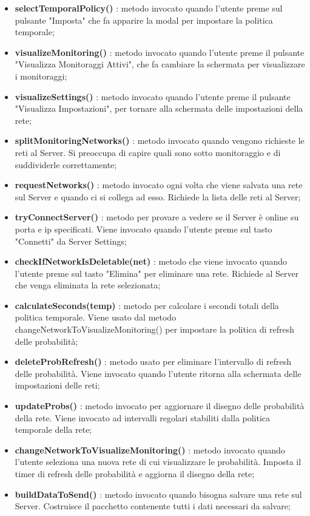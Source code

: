 \begin{itemize}
\begin{itemize}
			\item \textbf{selectTemporalPolicy()} : metodo invocato quando l'utente preme sul pulsante "Imposta" che fa apparire la modal per impostare la politica temporale;
			\item \textbf{visualizeMonitoring()} : metodo invocato quando l'utente preme il pulsante "Visualizza Monitoraggi Attivi", che fa cambiare la schermata per visualizzare i monitoraggi;
			\item \textbf{visualizeSettings()} : metodo invocato quando l'utente preme il pulsante "Visualizza Impostazioni", per tornare alla schermata delle impostazioni della rete;
			\item \textbf{splitMonitoringNetworks()} : metodo invocato quando vengono richieste le reti al Server. Si preoccupa di capire quali sono sotto monitoraggio e di suddividerle correttamente;
			\item \textbf{requestNetworks()} : metodo invocato ogni volta che viene salvata una rete sul Server e quando ci si collega ad esso. Richiede la lista delle reti al Server;
			\item \textbf{tryConnectServer()} : metodo per provare a vedere se il Server è online su porta e ip specificati. Viene invocato quando l'utente preme sul tasto "Connetti" da Server Settings;
			\item \textbf{checkIfNetworkIsDeletable(net)} : metodo che viene invocato quando l'utente preme sul tasto "Elimina" per eliminare una rete. Richiede al Server che venga eliminata la rete selezionata;
			\item \textbf{calculateSeconds(temp)} : metodo per calcolare i secondi totali della politica temporale. Viene usato dal metodo changeNetworkToVisualizeMonitoring() per impostare la politica di refresh delle probabilità;
			\item \textbf{deleteProbRefresh()} : metodo usato per eliminare l'intervallo di refresh delle probabilità. Viene invocato quando l'utente ritorna alla schermata delle impostazioni delle reti;
			\item \textbf{updateProbs()} : metodo invocato per aggiornare il disegno delle probabilità della rete. Viene invocato ad intervalli regolari stabiliti dalla politica temporale della rete;
			\item \textbf{changeNetworkToVisualizeMonitoring()} : metodo invocato quando l'utente seleziona una nuova rete di cui visualizzare le probabilità. Imposta il timer di refresh delle probabilità e aggiorna il disegno della rete;
			\item \textbf{buildDataToSend()} : metodo invocato quando bisogna salvare una rete sul Server. Costruisce il pacchetto contenente tutti i dati necessari da salvare;

\end{itemize}
\end{itemize}
